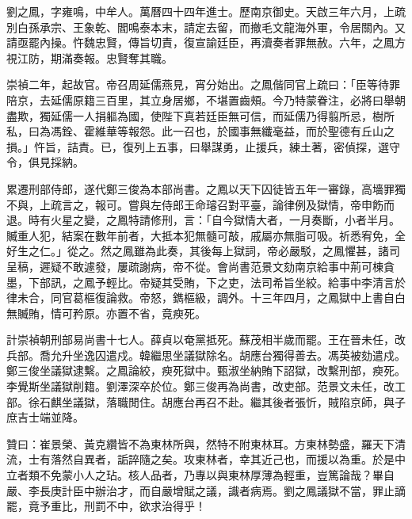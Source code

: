 \begin{pinyinscope}
劉之鳳，字雍鳴，中牟人。萬曆四十四年進士。歷南京御史。天啟三年六月，上疏別白孫承宗、王象乾、閻鳴泰本末，請定去留，而撤毛文龍海外軍，令居關內。又請亟罷內操。忤魏忠賢，傳旨切責，復宣諭廷臣，再瀆奏者罪無赦。六年，之鳳方視江防，期滿奏報。忠賢奪其職。

崇禎二年，起故官。帝召周延儒燕見，宵分始出。之鳳偕同官上疏曰：「臣等待罪陪京，去延儒原籍三百里，其立身居鄉，不堪置齒頰。今乃特蒙眷注，必將曰舉朝盡欺，獨延儒一人捐軀為國，使陛下真若廷臣無可信，而延儒乃得翦所忌，樹所私，曰為馮銓、霍維華等報怨。此一召也，於國事無纖毫益，而於聖德有丘山之損。」忤旨，詰責。已，復列上五事，曰舉謀勇，止援兵，練土著，密偵探，選守令，俱見採納。

累遷刑部侍郎，遂代鄭三俊為本部尚書。之鳳以天下囚徒皆五年一審錄，高墻罪獨不與，上疏言之，報可。嘗與左侍郎王命璿召對平臺，論律例及獄情，帝申飭而退。時有火星之變，之鳳特請修刑，言：「自今獄情大者，一月奏斷，小者半月。贓重人犯，結案在數年前者，大抵本犯無髓可敲，戚屬亦無脂可吸。祈悉宥免，全好生之仁。」從之。然之鳳雖為此奏，其後每上獄詞，帝必嚴駁，之鳳懼甚，諸司呈稿，遲疑不敢遽發，屢疏謝病，帝不從。會尚書范景文劾南京給事中荊可棟貪墨，下部訊，之鳳予輕比。帝疑其受賄，下之吏，法司希旨坐絞。給事中李清言於律未合，同官葛樞復論救。帝怒，鐫樞級，調外。十三年四月，之鳳獄中上書自白無贓賄，情可矜原。亦置不省，竟瘐死。

計崇禎朝刑部易尚書十七人。薛貞以奄黨抵死。蘇茂相半歲而罷。王在晉未任，改兵部。喬允升坐逸囚遣戍。韓繼思坐議獄除名。胡應台獨得善去。馮英被劾遣戍。鄭三俊坐議獄逮繫。之鳳論絞，瘐死獄中。甄淑坐納賄下詔獄，改繫刑部，瘐死。李覺斯坐議獄削籍。劉澤深卒於位。鄭三俊再為尚書，改吏部。范景文未任，改工部。徐石麒坐議獄，落職閒住。胡應台再召不赴。繼其後者張忻，賊陷京師，與子庶吉士端並降。

贊曰：崔景榮、黃克纘皆不為東林所與，然特不附東林耳。方東林勢盛，羅天下清流，士有落然自異者，詬誶隨之矣。攻東林者，幸其近己也，而援以為重。於是中立者類不免蒙小人之玷。核人品者，乃專以與東林厚薄為輕重，豈篤論哉？畢自嚴、李長庚計臣中辦治才，而自嚴增賦之議，識者病焉。劉之鳳議獄不當，罪止謫罷，竟予重比，刑罰不中，欲求治得乎！


\end{pinyinscope}